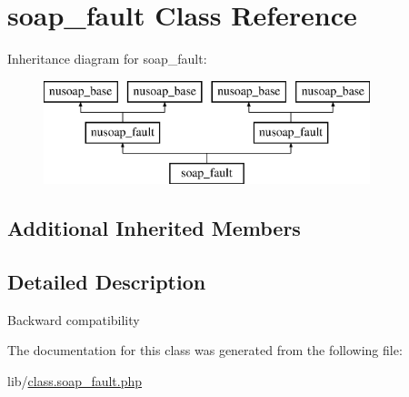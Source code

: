 \hypertarget{classsoap__fault}{}\section{soap\+\_\+fault Class Reference}
\label{classsoap__fault}
Inheritance diagram for soap\+\_\+fault\+:\begin{figure}[H]
\begin{center}
\leavevmode
\includegraphics[height=3.000000cm]{classsoap__fault}
\end{center}
\end{figure}
\subsection*{Additional Inherited Members}


\subsection{Detailed Description}
Backward compatibility 

The documentation for this class was generated from the following file\+:\begin{DoxyCompactItemize}
\item 
lib/\hyperlink{class_8soap__fault_8php}{class.\+soap\+\_\+fault.\+php}\end{DoxyCompactItemize}
